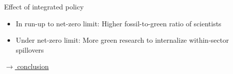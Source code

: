 \documentclass[11pt,aspectratio=169]{beamer}
\begin{document}
\begin{frame}{Effect  of integrated policy}
\begin{figure}[h!!]
\begin{subfigure}{0.45\textwidth}
			\end{subfigure}
		\end{figure}
		\vspace{3mm}	
		\begin{block}{}
			\begin{itemize}
				\item In run-up to net-zero limit: Higher fossil-to-green ratio of scientists %
				\item Under net-zero limit: More green research to internalize within-sector spillovers %
			\end{itemize}
		\end{block}	
		
		\vspace{-5.5mm}
		\hfill
		\hyperlink{conc}{\tiny{$\rightarrow$ conclusion}}
	\end{frame}
\end{document}
